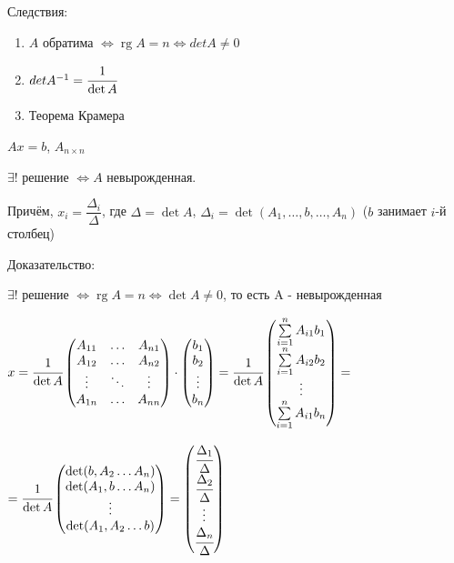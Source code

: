 \documentclass[twoside]{book}
\DeclareMathOperator{\rg}{rg}
\begin{document}
Следствия:
\begin{enumerate}
    \item \(A\) обратима \(\Leftrightarrow \rg A = n \Leftrightarrow det A \neq 0\)

    \item \(det A^{-1} = \cfrac{1}{\det A }\)

    \item Теорема Крамера
\end{enumerate}


\(Ax = b\), \(A_{n\times n}\)

\(\exists! \) решение \(\Leftrightarrow A\) невырожденная.

Причём, \(x_i = \dfrac{\Delta_i}{\Delta}\), где \(\Delta = \det A\), \(\Delta_i = \det (A_1, \ldots, b, \ldots, A_n)\) (\(b\) занимает \(i\)-й столбец)


Доказательство:

\(\exists! \) решение \(\Leftrightarrow \rg A = n \Leftrightarrow \det A \neq 0\), то есть A - невырожденная

\(x = \cfrac{1}{\det A} \begin{pmatrix}
    A_{11} & \ldots & A_{n1} \\
    A_{12} & \ldots & A_{n2} \\
    \vdots & \ddots & \vdots \\
    A_{1n} & \ldots & A_{nn} \\
\end{pmatrix} \cdot
\begin{pmatrix}
    b_1    \\
    b_2    \\
    \vdots \\
    b_n
\end{pmatrix}
=
\cfrac{1}{\det A}
\begin{pmatrix}
    \sum\limits_{i=1}^n A_{i1}b_1 \\
    \sum\limits_{i=1}^n A_{i2}b_2 \\
    \vdots                        \\
    \sum\limits_{i=1}^n A_{i1}b_n
\end{pmatrix} =\)

\(=\cfrac{1}{\det A}
\begin{pmatrix}
    \det (b,A_2\ldots A_n) \\
    \det (A_1,b\ldots A_n) \\
    \vdots                 \\
    \det (A_1,A_2\ldots b)
\end{pmatrix} =
\begin{pmatrix}
    \cfrac{\Delta_1}{\Delta} \\
    \cfrac{\Delta_2}{\Delta} \\
    \vdots                   \\
    \cfrac{\Delta_n}{\Delta}
\end{pmatrix}\)
\end{document}
